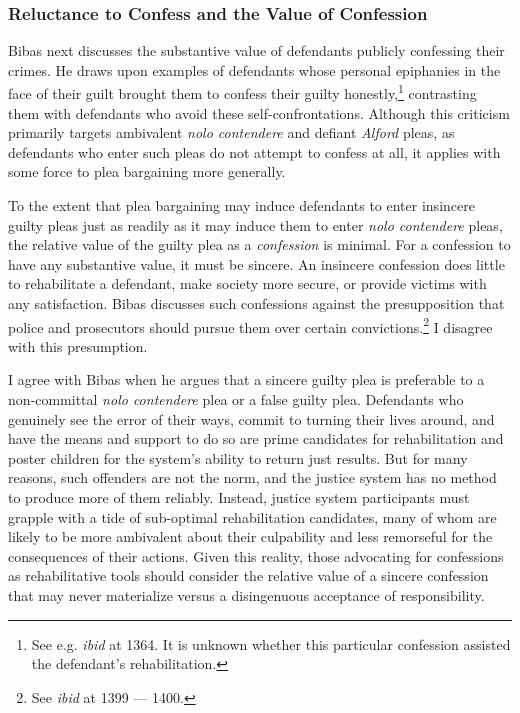 \subsubsection{Reluctance to Confess and the Value of Confession}

Bibas next discusses the substantive value of defendants publicly confessing their crimes. He draws upon examples of defendants whose personal epiphanies in the face of their guilt brought them to confess their guilty honestly,\footnote{See e.g. \textit{ibid} at 1364. It is unknown whether this particular confession assisted the defendant's rehabilitation.} contrasting them with defendants who avoid these self-confrontations. Although this criticism primarily targets ambivalent \textit{nolo contendere} and defiant \textit{Alford} pleas, as defendants who enter such pleas do not attempt to confess at all, it applies with some force to plea bargaining more generally. 

To the extent that plea bargaining may induce defendants to enter insincere guilty pleas just as readily as it may induce them to enter \textit{nolo contendere} pleas, the relative value of the guilty plea as a \textit{confession} is minimal. For a confession to have any substantive value, it must be sincere. An insincere confession does little to rehabilitate a defendant, make society more secure, or provide victims with any satisfaction. Bibas discusses such confessions against the presupposition that police and prosecutors should pursue them over certain convictions.\footnote{See \textit{ibid} at 1399 — 1400.} I disagree with this presumption. 

I agree with Bibas when he argues that a sincere guilty plea is preferable to a non-committal \textit{nolo contendere} plea or a false guilty plea. Defendants who genuinely see the error of their ways, commit to turning their lives around, and have the means and support to do so are prime candidates for rehabilitation and poster children for the system's ability to return just results. But for many reasons, such offenders are not the norm, and the justice system has no method to produce more of them reliably. Instead, justice system participants must grapple with a tide of sub-optimal rehabilitation candidates, many of whom are likely to be more ambivalent about their culpability and less remorseful for the consequences of their actions. Given this reality, those advocating for confessions as rehabilitative tools should consider the relative value of a sincere confession that may never materialize versus a disingenuous acceptance of responsibility. 

